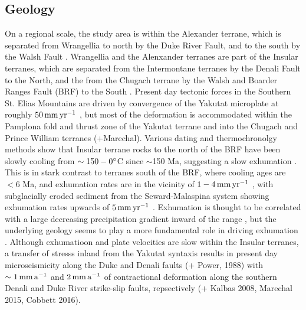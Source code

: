 \documentclass[review]{igs}
\begin{document}
\subsection{Geology}
On a regional scale, the study area is within the Alexander terrane, which is separated from Wrangellia to north by the Duke River Fault, and to the south by the Walsh Fault \citep[e.g.][]{Campbell1978,Israel2007,Wheeler1963}. Wrangellia and the Alenxander terranes are part of the Insular terranes, which are separated from the Intermontane terranes by the Denali Fault to the North, and the from the Chugach terrane by the Walsh and Boarder Ranges Fault (BRF) to the South \citep[e.g.][]{Campbell1982,Plafker1987}. Present day tectonic forces in the Southern St. Elias Mountains are driven by convergence of the Yakutat microplate at roughly $\rm 50\,mm\,yr^{-1}$ \citep[e.g.][]{Elliott2013,Fletcher2003,Plafker1978}, but most of the deformation is accommodated within the Pamplona fold and thrust zone of the Yakutat terrane \citep[e.g.][]{Worthington2008} and into the Chugach and Prince William terranes \citep[e.g][]{Fletcher2003}(+Marechal). Various dating and thermochronolgy methods show that Insular terrane rocks to the north of the BRF have been slowly cooling from $\rm \sim150\--0^{\circ}$C since $\sim$150 Ma, suggesting a slow exhumation \citep[e.g.][]{Berger2008,Dodds1988,Enkelmann2017}. This is in stark contrast to terranes south of the BRF, where cooling ages are $<6$ Ma, and exhumation rates are in the vicinity of $\rm 1\--4\,mm\,yr^{-1}$ \citep[e.g.][]{Berger2008,Enkelmann2008,OSullivan1997}, with subglacially eroded sediment from the Seward-Malaspina system showing exhumation rates upwards of $\rm 5\,mm\,yr^{-1}$ \citep{Enkelmann2009}. Exhumation is thought to be correlated with a large decreasing precipitation gradient inward of the range \citep[e.g.][]{Berger2008}, but the underlying geology seems to play a more fundamental role in driving exhumation \citep{Enkelmann2017}. Although exhumatioon and plate velocities are slow within the Insular terranes, a transfer of stresss inland from the Yakutat syntaxis results in present day microseismicity along the Duke and Denali faults (+ Power, 1988) with $\rm{\sim 1\,mm\,a^{-1}}$ and $\rm{2\,mm\,a^{-1}}$ of contractional deformation along the southern Denali and Duke River strike-slip faults, repsectively (+ Kalbas 2008, Marechal 2015, Cobbett 2016). 
\end{document}
